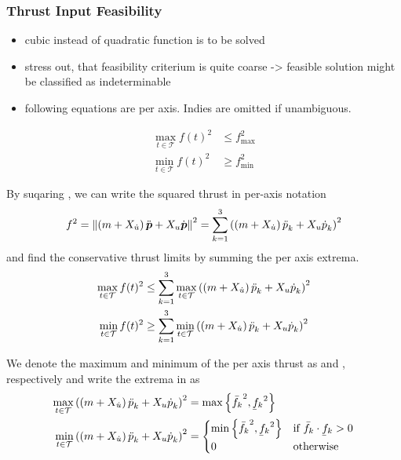 \subsubsection{Thrust Input Feasibility}
\begin{itemize}
	\color{red}
	\item cubic instead of quadratic function is to be solved
	\item stress out, that feasibility criterium is quite coarse -> feasible solution might be classified as indeterminable
	\item following equations are per axis. Indies are omitted if unambiguous.
\end{itemize}

\begin{align}
	\label{eq:thrust-feasibility-equivilency-max}
	\max_{t \in \mathcal{T}} f(t)^2
	&\leq
	f_\text{max}^2 \\
	\label{eq:thrust-feasibility-equivilency-min}
	\min_{t \in \mathcal{T}} f(t)^2
	&\geq
	f_\text{min}^2
\end{align}

By suqaring , we can write the squared thrust in per-axis notation
\begin{equation}
	\label{eq:thrust-squared-per-axis}
	f^2 = 
	\left\lVert
	\left(m + X_{\dot{u}}\right) \mbox{$\ddot{\bm{p}}$} + X_u \mbox{$\dot{\bm{p}}$}
	\right\rVert^2
	= 
	\sum_{k=1}^{3}
	\left(\left(m + X_{\dot{u}}\right)\mbox{$\ddot{p}$}_k + X_u \mbox{$\dot{p}$}_k \right)^2
\end{equation}
and find the conservative thrust limits by summing the per axis extrema.
\begin{align}
	\label{eq:fmax-per-axis}
	\max_{t \in \mathcal{T}} f(t)^2
	&\leq
	\sum_{k=1}^{3}
	\max_{t \in \mathcal{T}}
	\left(
		\left(m + X_{\dot{u}}\right)
		\mbox{$\ddot{p}$}_k
		+ X_u \mbox{$\dot{p}$}_k
	\right)^2 \\
	\label{eq:fmin-per-axis}
	\min_{t \in \mathcal{T}} f(t)^2
	&\geq
	\sum_{k=1}^{3}
	\min_{t \in \mathcal{T}}
	\left(
		\left(m + X_{\dot{u}}\right)
		\mbox{$\ddot{p}$}_k
		+ X_u \mbox{$\dot{p}$}_k
	\right)^2
\end{align}

We denote the maximum and minimum of the per axis thrust as \fmaxaxis and \fminaxis, respectively 
and write the extrema in  as
\begin{align}
	\max_{t \in \mathcal{T}}
	\left(
		\left(m + X_{\dot{u}}\right)
		\ppp_k
		+ X_u \pp_k
	\right)^2
	&= 
	\max\left\{\fmaxaxis^2, \fminaxis^2\right\} \\
	\min_{t \in \mathcal{T}}
	\left(
		\left(m + X_{\dot{u}}\right)
		\ppp_k
		+ X_u \pp_k
	\right)^2
	&=
	\begin{cases}
		\min\left\{\fmaxaxis^2, \fminaxis^2\right\}
		& \text{if } \fmaxaxis\cdot\fminaxis > 0 \\
		0
		& \text{otherwise}
	\end{cases}
\end{align}

